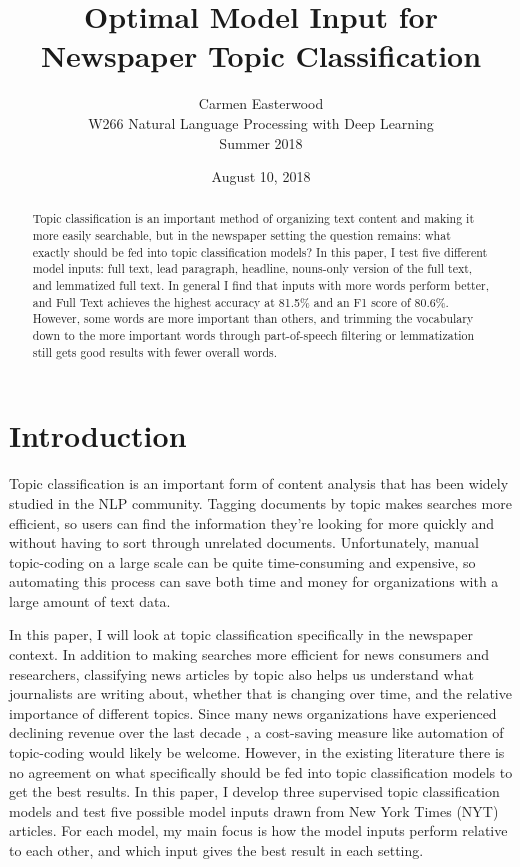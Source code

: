 \documentclass[11pt,a4paper,table]{article}
\title{Optimal Model Input for Newspaper Topic Classification}
\author{Carmen Easterwood \\
  W266 Natural Language Processing with Deep Learning \\
  Summer 2018 \\
}
\date{August 10, 2018}
\begin{document}
\maketitle

\begin{abstract}
Topic classification is an important method of organizing text content and making it more easily searchable, but in the newspaper setting the question remains: what exactly should be fed into topic classification models? In this paper, I test five different model inputs: full text, lead paragraph, headline, nouns-only version of the full text, and lemmatized full text. In general I find that inputs with more words perform better, and Full Text achieves the highest accuracy at 81.5\% and an F1 score of 80.6\%. However, some words are more important than others, and trimming the vocabulary down to the more important words through part-of-speech filtering or lemmatization still gets good results with fewer overall words.
\end{abstract}

\section{Introduction}
\label{sec:intro}

Topic classification is an important form of content analysis that has been widely studied in the NLP community. Tagging documents by topic makes searches more efficient, so users can find the information they're looking for more quickly and without having to sort through unrelated documents. Unfortunately, manual topic-coding on a large scale can be quite time-consuming and expensive, so automating this process can save both time and money for organizations with a large amount of text data.

In this paper, I will look at topic classification specifically in the newspaper context. In addition to making searches more efficient for news consumers and researchers, classifying news articles by topic also helps us understand what journalists are writing about, whether that is changing over time, and the relative importance of different topics. Since many news organizations have experienced declining revenue over the last decade \cite{Pew}, a cost-saving measure like automation of topic-coding would likely be welcome. However, in the existing literature there is no agreement on what specifically should be fed into topic classification models to get the best results. In this paper, I develop three supervised topic classification models and test five possible model inputs drawn from New York Times (NYT) articles. For each model, my main focus is how the model inputs perform relative to each other, and which input gives the best result in each setting.
\end{document}
